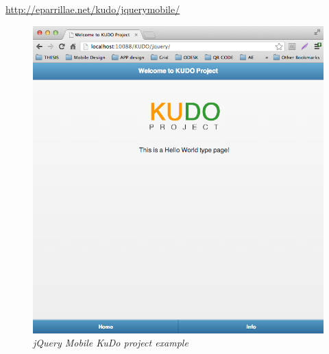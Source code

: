 \documentclass[a4paper,12pt]{book}
\begin{document}
\url{http://eparrillae.net/kudo/jquerymobile/}

\begin{figure}[H]
    \centering
    \includegraphics[width=12cm, keepaspectratio]{img/jquery5.png}
    \caption{\textit{jQuery Mobile KuDo project example}}
 \end{figure}
\end{document}
